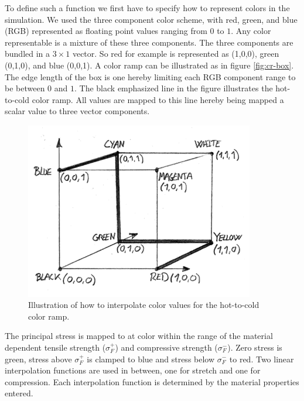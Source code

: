 To define such a function we first have to specify how to represent
colors in the simulation. We used the three component color scheme,
with red, green, and blue (RGB) represented as floating point values
ranging from $0$ to $1$. Any color representable is a mixture of these three
components. 
%
The three components are bundled in a $3 \times 1$ vector. So red for
example is represented as (1,0,0), green (0,1,0), and blue (0,0,1).
%
A color ramp can be illustrated as in
figure \vref{fig:cr-box}. The edge length of the box is one hereby
limiting each RGB component range to be between $0$ and $1$.
The black emphasized line in the figure illustrates the hot-to-cold
color ramp. All values are mapped to this line hereby being mapped
a scalar value to three vector components. 

\begin{figure}
  \centering
  \includegraphics[width=10cm]{./images/helper_tools_color_ramp_box.png}
\caption{Illustration of how to interpolate color values for the hot-to-cold color ramp.}
\label{fig:cr-box}
\end{figure}

The principal stress is mapped to at color within the range of the
material dependent tensile strength ($\sigma^+_F$) and compressive
strength ($\sigma^-_F$). Zero stress is green, stress above
$\sigma^+_F$ is clamped to blue and stress below $\sigma^-_F$ to red.
Two linear interpolation functions are used in between, one for stretch and
one for compression. Each interpolation function is determined by the
material properties entered. 


